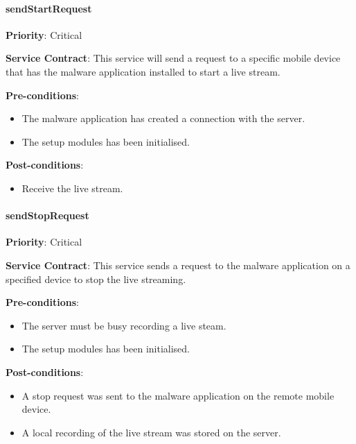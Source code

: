         \paragraph{sendStartRequest}
			\begin{description}
			    \item{\textbf{Priority}:} Critical%
			    \item{\textbf{Service Contract}:}
			    This service will send a request to a specific mobile device that has the malware application installed to start a live stream.
			    \item{\textbf{Pre-conditions}:}%
    			    \begin{itemize}
    			        \item The malware application has created a connection with the server.
    			        \item The setup modules has been initialised.
    			    \end{itemize}
			    \item{\textbf{Post-conditions}:} %
    			    \begin{itemize}
    			    \item Receive the live stream.
    			    \end{itemize}
			\end{description}

    
         \paragraph{sendStopRequest}
			\begin{description}
			    \item{\textbf{Priority}:} Critical%
			    \item{\textbf{Service Contract}:} This service sends a request to the malware application on a specified device to stop the live streaming.%
			    \item{\textbf{Pre-conditions}:}%
    			    \begin{itemize}
    			        \item The server must be busy recording a live steam.
    			        \item The setup modules has been initialised.
    			    \end{itemize}
			    \item{\textbf{Post-conditions}:} %
    			    \begin{itemize}
    			    \item A stop request was sent to the malware application on the remote mobile device.
    			    \item A local recording of the live stream was stored on the server.
    			    \end{itemize}
			\end{description}
		
